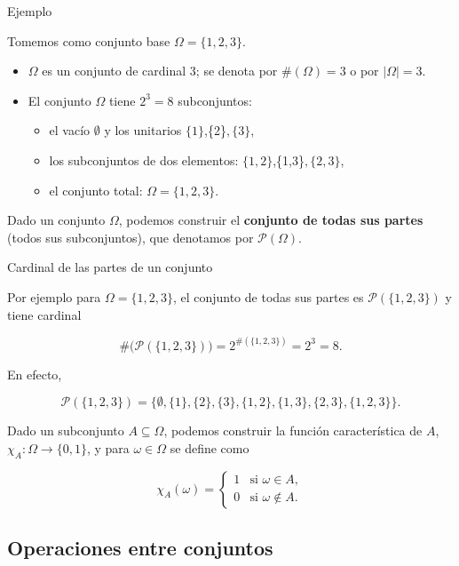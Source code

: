 \documentclass[
  letterpaper,
  DIV=11,
  numbers=noendperiod]{scrreprt}
\providecommand{\tightlist}{%
  \setlength{\itemsep}{0pt}\setlength{\parskip}{0pt}}\usepackage{longtable,booktabs,array}
\begin{document}
\begin{Ejemplo}{Ejemplo}{}

Tomemos como conjunto base \(\Omega=\{1,2,3\}\).

\begin{itemize}
\tightlist
\item
  \(\Omega\) es un conjunto de cardinal 3; se denota por
  \(\#(\Omega)=3\) o por \(|\Omega|=3\).
\item
  El conjunto \(\Omega\) tiene \(2^3=8\) subconjuntos:

  \begin{itemize}
  \tightlist
  \item
    el vacío \(\emptyset\) y los unitarios \(\{1\}\),\{2\}\(,\{3\}\),
  \item
    los subconjuntos de dos elementos: \(\{1,2\}\),\{1,3\}\(,\{2,3\}\),
  \item
    el conjunto total: \(\Omega=\{1,2,3\}\).
  \end{itemize}
\end{itemize}

\end{Ejemplo}

Dado un conjunto \(\Omega\), podemos construir el \textbf{conjunto de
todas sus partes} (todos sus subconjuntos), que denotamos por
\(\mathcal{P}(\Omega)\).

\begin{Ejemplo}{Cardinal de las partes de un conjunto}{}

Por ejemplo para \(\Omega=\{1,2,3\}\), el conjunto de todas sus partes
es \(\mathcal{P}(\{1,2,3\})\) y tiene cardinal

\[
\#\big(\mathcal{P}(\{1,2,3\})\big)=2^{\#(\{1,2,3\})}=2^3=8.
\]

\end{Ejemplo}

En efecto,

\[
\mathcal{P}(\{1,2,3\})=\{\emptyset,\{1\},\{2\},\{3\},\{1,2\},\{1,3\},\{2,3\},\{1,2,3\}
\}.
\]

Dado un subconjunto \(A\subseteq \Omega\), podemos construir la función
característica de \(A\), \(\chi_A:\Omega \to \{0,1\}\), y para
\(\omega\in \Omega\) se define como

\[
\chi_A(\omega)=
\begin{cases}
1 & \text{si }\omega \in A,\\
0 & \text{si }\omega \notin A.
\end{cases}
\]

\subsection{Operaciones entre
conjuntos}\label{operaciones-entre-conjuntos}
\end{document}
